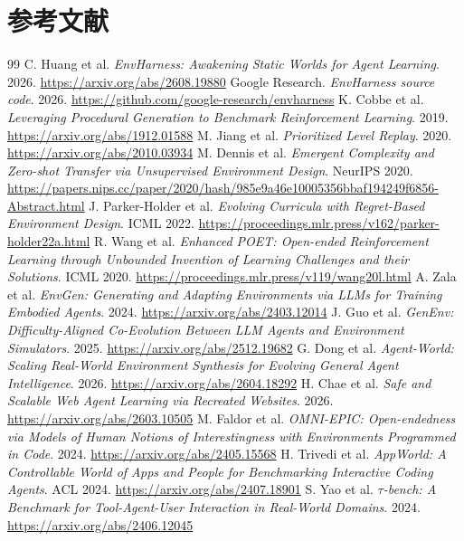 \documentclass[11pt,a4paper,fontset=fandol]{ctexart}
\begin{document}
\section*{参考文献}
\begin{thebibliography}{99}
 C. Huang et al. \emph{EnvHarness: Awakening Static Worlds for Agent Learning}. 2026. \url{https://arxiv.org/abs/2608.19880}
 Google Research. \emph{EnvHarness source code}. 2026. \url{https://github.com/google-research/envharness}
 K. Cobbe et al. \emph{Leveraging Procedural Generation to Benchmark Reinforcement Learning}. 2019. \url{https://arxiv.org/abs/1912.01588}
 M. Jiang et al. \emph{Prioritized Level Replay}. 2020. \url{https://arxiv.org/abs/2010.03934}
 M. Dennis et al. \emph{Emergent Complexity and Zero-shot Transfer via Unsupervised Environment Design}. NeurIPS 2020. \url{https://papers.nips.cc/paper/2020/hash/985e9a46e10005356bbaf194249f6856-Abstract.html}
 J. Parker-Holder et al. \emph{Evolving Curricula with Regret-Based Environment Design}. ICML 2022. \url{https://proceedings.mlr.press/v162/parker-holder22a.html}
 R. Wang et al. \emph{Enhanced POET: Open-ended Reinforcement Learning through Unbounded Invention of Learning Challenges and their Solutions}. ICML 2020. \url{https://proceedings.mlr.press/v119/wang20l.html}
 A. Zala et al. \emph{EnvGen: Generating and Adapting Environments via LLMs for Training Embodied Agents}. 2024. \url{https://arxiv.org/abs/2403.12014}
 J. Guo et al. \emph{GenEnv: Difficulty-Aligned Co-Evolution Between LLM Agents and Environment Simulators}. 2025. \url{https://arxiv.org/abs/2512.19682}
 G. Dong et al. \emph{Agent-World: Scaling Real-World Environment Synthesis for Evolving General Agent Intelligence}. 2026. \url{https://arxiv.org/abs/2604.18292}
 H. Chae et al. \emph{Safe and Scalable Web Agent Learning via Recreated Websites}. 2026. \url{https://arxiv.org/abs/2603.10505}
 M. Faldor et al. \emph{OMNI-EPIC: Open-endedness via Models of Human Notions of Interestingness with Environments Programmed in Code}. 2024. \url{https://arxiv.org/abs/2405.15568}
 H. Trivedi et al. \emph{AppWorld: A Controllable World of Apps and People for Benchmarking Interactive Coding Agents}. ACL 2024. \url{https://arxiv.org/abs/2407.18901}
 S. Yao et al. \emph{$\tau$-bench: A Benchmark for Tool-Agent-User Interaction in Real-World Domains}. 2024. \url{https://arxiv.org/abs/2406.12045}

\end{thebibliography}
\end{document}
